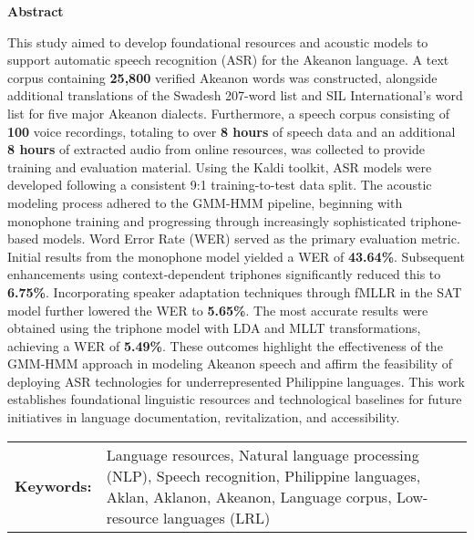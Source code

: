 \begin{center}
\textbf{Abstract}
\end{center}
\setlength{\parindent}{0pt}
This study aimed to develop foundational resources and acoustic models to support automatic speech recognition (ASR) for the Akeanon language. A text corpus containing \textbf{25,800} verified Akeanon words was constructed, alongside additional translations of the Swadesh 207-word list and SIL International's word list for five major Akeanon dialects. Furthermore, a speech corpus consisting of \textbf{100} voice recordings, totaling to over \textbf{8 hours} of speech data and an additional \textbf{8 hours} of extracted audio from online resources, was collected to provide training and evaluation material. Using the Kaldi toolkit, ASR models were developed following a consistent 9:1 training-to-test data split. The acoustic modeling process adhered to the GMM-HMM pipeline, beginning with monophone training and progressing through increasingly sophisticated triphone-based models. Word Error Rate (WER) served as the primary evaluation metric. Initial results from the monophone model yielded a WER of \textbf{43.64\%}. Subsequent enhancements using context-dependent triphones significantly reduced this to \textbf{6.75\%}. Incorporating speaker adaptation techniques through fMLLR in the SAT model further lowered the WER to \textbf{5.65\%}. The most accurate results were obtained using the triphone model with LDA and MLLT transformations, achieving a WER of \textbf{5.49\%}. These outcomes highlight the effectiveness of the GMM-HMM approach in modeling Akeanon speech and affirm the feasibility of deploying ASR technologies for underrepresented Philippine languages. This work establishes foundational linguistic resources and technological baselines for future initiatives in language documentation, revitalization, and accessibility.


\begin{tabular}{lp{4.25in}}
\hspace{-0.5em}\textbf{Keywords:}\hspace{0.25em} & Language resources, Natural language processing (NLP), Speech recognition, Philippine languages, Aklan, Aklanon, Akeanon, Language corpus, Low-resource languages (LRL)\\
\end{tabular}
